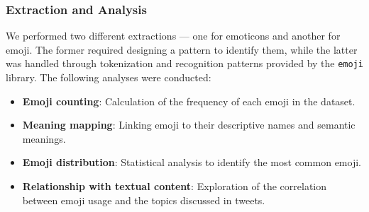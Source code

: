 \subsubsection{Extraction and Analysis}
We performed two different extractions — one for emoticons and another for emoji. The former required designing a pattern to identify them, while the latter was handled through tokenization and recognition patterns provided by the \texttt{emoji} library. The following analyses were conducted:
\begin{itemize}
    \item \textbf{Emoji counting}: Calculation of the frequency of each emoji in the dataset.
    \item \textbf{Meaning mapping}: Linking emoji to their descriptive names and semantic meanings.
    \item \textbf{Emoji distribution}: Statistical analysis to identify the most common emoji.
    \item \textbf{Relationship with textual content}: Exploration of the correlation between emoji usage and the topics discussed in tweets.
\end{itemize}

